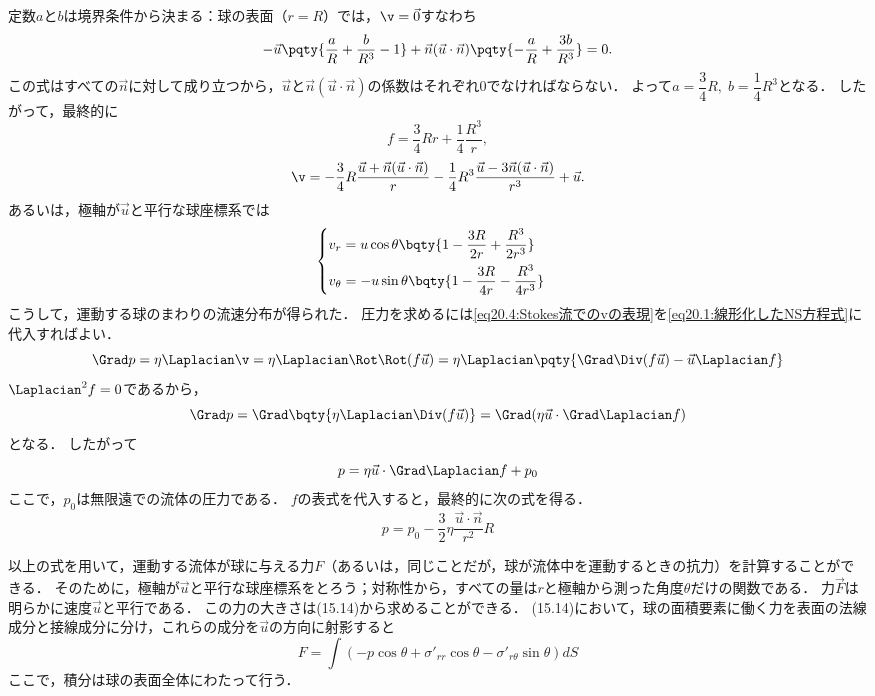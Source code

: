 定数$a$と$b$は境界条件から決まる：球の表面（$r=R$）では，$\v=\vec{0}$すなわち
\[
    -\vec{u} \pqty{ \frac{a}{R}+\frac{b}{R^3}-1 } + \vec{n}(\vec{u}\cdot\vec{n}) \pqty{ -\frac{a}{R}+\frac{3b}{R^3} } = 0 .
\]
この式はすべての$\vec{n}$に対して成り立つから，$\vec{u}$と$\vec{n}(\vec{u}\cdot\vec{n})$の係数はそれぞれ0でなければならない．
よって$a=\dfrac{3}{4}R, \; b = \dfrac{1}{4}R^3$となる．
したがって，最終的に
\begin{equation}
    f = \frac{3}{4}Rr + \frac{1}{4} \frac{R^3}{r} ,
\end{equation}
\begin{equation}\label{eq20.9:Stokes流での流速}
    \v = -\frac{3}{4}R \frac{\vec{u}+\vec{n}(\vec{u}\cdot\vec{n})}{r} -\frac{1}{4}R^3 \frac{\vec{u}-3\vec{n}(\vec{u}\cdot\vec{n})}{r^3} + \vec{u} .
\end{equation}
あるいは，極軸が$\vec{u}$と平行な球座標系では
\begin{equation}\label{eq20.10:Stokes流での流速成分}
    \begin{cases}
        v_r = u\cos\theta \bqty{ 1-\dfrac{3R}{2r} + \dfrac{R^3}{2r^3} } \\[7pt]
        v_\theta = -u\sin\theta \bqty{ 1-\dfrac{3R}{4r} - \dfrac{R^3}{4r^3} } \\
    \end{cases}
\end{equation}
こうして，運動する球のまわりの流速分布が得られた．
圧力を求めるには\eqref{eq20.4:Stokes流でのvの表現}を\eqref{eq20.1:線形化したNS方程式}に代入すればよい．
\[
    \Grad p = \eta\Laplacian\v
    = \eta\Laplacian\Rot\Rot(f\vec{u})
    = \eta\Laplacian\pqty{ \Grad\Div(f\vec{u})-\vec{u}\Laplacian f }
\]
$\Laplacian^2f=0$であるから，
\[
    \Grad p = \Grad\bqty{ \eta\Laplacian\Div(f\vec{u}) }  
    = \Grad(\eta\vec{u}\cdot\Grad\Laplacian f)
\]
となる．
したがって
\begin{equation}
    p = \eta \vec{u}\cdot\Grad\Laplacian f + p_0
\end{equation}
ここで，$p_0$は無限遠での流体の圧力である．
$f$の表式を代入すると，最終的に次の式を得る．
\begin{equation}\label{eq20.12:Stokes流での圧力1}
    p = p_0 - \frac{3}{2}\eta \frac{\vec{u}\cdot\vec{n}}{r^2} R
\end{equation}


以上の式を用いて，運動する流体が球に与える力$F$（あるいは，同じことだが，球が流体中を運動するときの抗力）を計算することができる．
そのために，極軸が$\vec{u}$と平行な球座標系をとろう；対称性から，すべての量は$r$と極軸から測った角度$\theta$だけの関数である．
力$\vec{F}$は明らかに速度$\vec{u}$と平行である．
この力の大きさは(15.14)から求めることができる．
(15.14)において，球の面積要素に働く力を表面の法線成分と接線成分に分け，これらの成分を$\vec{u}$の方向に射影すると
\begin{equation}\label{eq20.13:Stokes流で抗力を求める積分}
    F = \int( -p\cos\theta + \sigma'_{rr}\cos\theta - \sigma'_{r\theta} \sin\theta )dS
\end{equation}
ここで，積分は球の表面全体にわたって行う．


